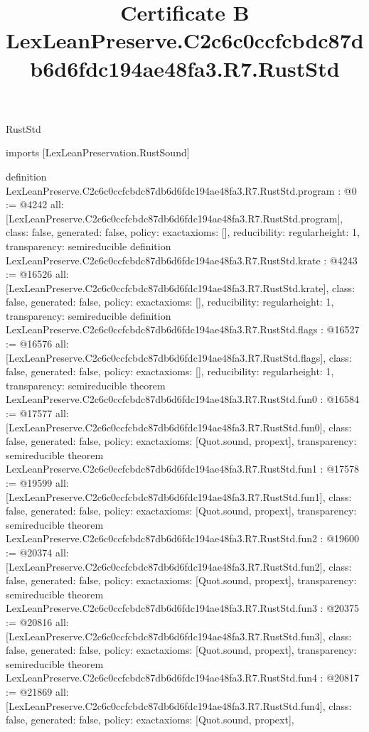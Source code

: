 \begin{lexlean}{RustStd}
\title{Certificate B LexLeanPreserve.C2c6c0ccfcbdc87db6d6fdc194ae48fa3.R7.RustStd}
\begin{coremodule}
imports [LexLeanPreservation.RustSound]

definition LexLeanPreserve.C2c6c0ccfcbdc87db6d6fdc194ae48fa3.R7.RustStd.program : @0 := @4242 {
  all: [LexLeanPreserve.C2c6c0ccfcbdc87db6d6fdc194ae48fa3.R7.RustStd.program],
  class: false,
  generated: false,
  policy: exact{axioms: []},
  reducibility: regular{height: 1},
  transparency: semireducible
}
definition LexLeanPreserve.C2c6c0ccfcbdc87db6d6fdc194ae48fa3.R7.RustStd.krate : @4243 := @16526 {
  all: [LexLeanPreserve.C2c6c0ccfcbdc87db6d6fdc194ae48fa3.R7.RustStd.krate],
  class: false,
  generated: false,
  policy: exact{axioms: []},
  reducibility: regular{height: 1},
  transparency: semireducible
}
definition LexLeanPreserve.C2c6c0ccfcbdc87db6d6fdc194ae48fa3.R7.RustStd.flags : @16527 := @16576 {
  all: [LexLeanPreserve.C2c6c0ccfcbdc87db6d6fdc194ae48fa3.R7.RustStd.flags],
  class: false,
  generated: false,
  policy: exact{axioms: []},
  reducibility: regular{height: 1},
  transparency: semireducible
}
theorem LexLeanPreserve.C2c6c0ccfcbdc87db6d6fdc194ae48fa3.R7.RustStd.fun0 : @16584 := @17577 {
  all: [LexLeanPreserve.C2c6c0ccfcbdc87db6d6fdc194ae48fa3.R7.RustStd.fun0],
  class: false,
  generated: false,
  policy: exact{axioms: [Quot.sound, propext]},
  transparency: semireducible
}
theorem LexLeanPreserve.C2c6c0ccfcbdc87db6d6fdc194ae48fa3.R7.RustStd.fun1 : @17578 := @19599 {
  all: [LexLeanPreserve.C2c6c0ccfcbdc87db6d6fdc194ae48fa3.R7.RustStd.fun1],
  class: false,
  generated: false,
  policy: exact{axioms: [Quot.sound, propext]},
  transparency: semireducible
}
theorem LexLeanPreserve.C2c6c0ccfcbdc87db6d6fdc194ae48fa3.R7.RustStd.fun2 : @19600 := @20374 {
  all: [LexLeanPreserve.C2c6c0ccfcbdc87db6d6fdc194ae48fa3.R7.RustStd.fun2],
  class: false,
  generated: false,
  policy: exact{axioms: [Quot.sound, propext]},
  transparency: semireducible
}
theorem LexLeanPreserve.C2c6c0ccfcbdc87db6d6fdc194ae48fa3.R7.RustStd.fun3 : @20375 := @20816 {
  all: [LexLeanPreserve.C2c6c0ccfcbdc87db6d6fdc194ae48fa3.R7.RustStd.fun3],
  class: false,
  generated: false,
  policy: exact{axioms: [Quot.sound, propext]},
  transparency: semireducible
}
theorem LexLeanPreserve.C2c6c0ccfcbdc87db6d6fdc194ae48fa3.R7.RustStd.fun4 : @20817 := @21869 {
  all: [LexLeanPreserve.C2c6c0ccfcbdc87db6d6fdc194ae48fa3.R7.RustStd.fun4],
  class: false,
  generated: false,
  policy: exact{axioms: [Quot.sound, propext]},
}
\end{coremodule}
\end{lexlean}
